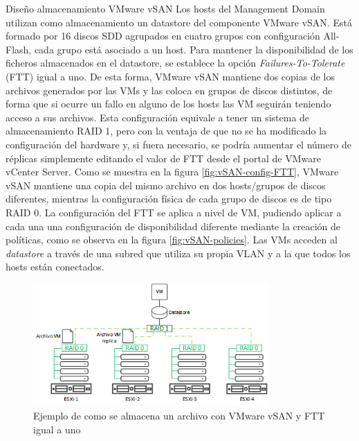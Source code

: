 \begin{subsubsection}{Diseño almacenamiento VMware vSAN}
  \label{subsubsec:diseno-vsan}
  Los hosts del Management Domain utilizan como almacenamiento un datastore del componente VMware vSAN. Está formado por 16 discos SDD agrupados en cuatro grupos con configuración All-Flash, cada grupo está asociado a un host. Para mantener la disponibilidad de los ficheros almacenados en el datastore, se establece la opción \textit{Failures-To-Tolerate} (FTT) igual a uno. De esta forma, VMware vSAN mantiene dos copias de los archivos generados por las VMs y las coloca en grupos de discos distintos, de forma que si ocurre un fallo en alguno de los hosts las VM seguirán teniendo acceso a sus archivos. Esta configuración equivale a tener un sistema de almacenamiento RAID 1, pero con la ventaja de que no se ha modificado la configuración del hardware y, si fuera necesario, se podría aumentar el número de réplicas simplemente editando el valor de FTT desde el portal de VMware vCenter Server. Como se muestra en la figura \ref{fig:vSAN-config-FTT}, VMware vSAN mantiene una copia del mismo archivo en dos hosts/grupos de discos diferentes, mientras la configuración física de cada grupo de discos es de tipo RAID 0. La configuración del FTT se aplica a nivel de VM, pudiendo aplicar a cada una una configuración de disponibilidad diferente mediante la creación de políticas, como se observa en la figura \ref{fig:vSAN-policies}. Las VMs acceden al \textit{datastore} a través de una subred que utiliza su propia VLAN y a la que todos los hosts están conectados. 
  \begin{figure}[h]
    \centering
    \includegraphics[width=0.8\textwidth]{imaxes/pruebaconcepto/vSANconfig.png}
    \caption{Ejemplo de como se almacena un archivo con VMware vSAN y FTT igual a uno}

\end{figure}
\end{subsubsection}

